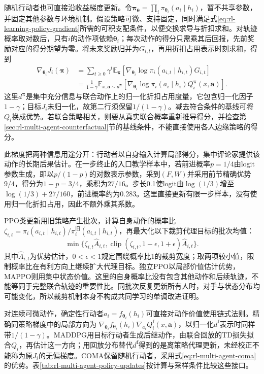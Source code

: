 随机行动者也可直接沿收益梯度更新。令$\bm\pi_{\bm\theta}=\prod_i\pi_{\bm\theta_i}(a_i\mid h_i)$，暂不共享参数，并固定其他参数与环境机制。假设策略可微、支持固定，同时满足式\eqref{eq:rl-learning-policy-gradient}所需的可积支配条件，以便交换求导与折扣求和。对轨迹概率取对数后，只有$i$的动作项依赖$\bm\theta_i$；每次动作的得分只需乘其后回报，先前奖励对应的得分期望为零。将未来奖励归并为$G_{i,t}$，再用折扣占用表示时刻求和，得到
\begin{align}
 \nabla_{\bm\theta_i}J_i(\bm\pi)
 &=\sum_{t\geq0}\gamma^t
   \mathbb E_{\bm\pi}
   [\nabla_{\bm\theta_i}\log\pi_i(a_{i,t}\mid h_{i,t})G_{i,t}]
 \nonumber\\
 &=\frac{1}{1-\gamma}
   \mathbb E_{x,\bm a\sim d^{\bm\pi}}
   [\nabla_{\bm\theta_i}\log\pi_i(a_i\mid h_i)
           Q_i^{\bm\pi}(x,\bm a)].
 \label{eq:rl-multi-agent-policy-gradient}
\end{align}
这里$d^{\bm\pi}$是集中充分信息与联合动作上的归一化折扣占用度量，它包含归一化因子$1-\gamma$；目标$J_i$未归一化，故第二行须保留$1/(1-\gamma)$。减去符合条件的基线可将$Q_i$换成优势。若联合策略相关，则要从真实联合概率重新推导得分，并检查第\ref{sec:rl-multi-agent-counterfactual}节的基线条件，不能直接使用各人边缘策略的得分。

此梯度把两种信息用途分开：行动者以自身输入计算局部得分，集中评论家提供该动作的长期后果估计。在一步终止的入口教学样本中，若前进概率$p=1/4$由logit参数生成，即以$p/(1-p)$的对数表示参数，采到$(F,W)$并采用前节精确优势$9/4$，得分为$1-p=3/4$，乘积为$27/16$。步长0.1使logit由$\log(1/3)$增至$\log(1/3)+27/160$，前进概率约为0.283。这里直接更新有限一步样本，没有使用归一化折扣占用，因此不额外乘其系数。

PPO类更新用旧策略产生批次，计算自身动作的概率比$\zeta_{i,t}=\pi_i(a_{i,t}\mid h_{i,t})/
\pi_i^{\text{旧}}(a_{i,t}\mid h_{i,t})$，再最大化以下裁剪代理目标的批次均值：
\[
 \min\{\zeta_{i,t}\widehat A_{i,t},
       \operatorname{clip}(\zeta_{i,t},1-\epsilon,1+\epsilon)
                      \widehat A_{i,t}\}.
\]
其中$\widehat A_{i,t}$为优势估计，$0<\epsilon<1$规定围绕概率比1的裁剪宽度；取两项较小值，限制概率比在有利方向上继续扩大代理目标。独立PPO以局部价值估计优势，MAPPO则用集中状态价值。这里的自身概率比没有包含其他动作和后续轨迹，不能等同于完整联合轨迹的重要性比。同批次反复更新所有人时，对手与状态分布均可能变化，所以裁剪机制本身不构成共同学习的单调改进证明。

对连续可微动作，确定性行动者$a_i=f_{\bm\theta_i}(h_i)$可直接对动作价值使用链式法则。精确同策略梯度中的局部方向为
$\nabla_{\bm\theta_i}f_{\bm\theta_i}(h_i)\nabla_{a_i}Q_i^{\bm f}(x,\bm a)$，以归一化$d^{\bm f}$表示时同样带$1/(1-\gamma)$。MADDPG用目标行动者生成后继动作，由联合回放的TD损失拟合$Q_i$，再估计这一方向；用回放分布替代$d^{\bm f}$得到的是离策略代理更新，未经校正不能称为原$J_i$的无偏梯度。COMA保留随机行动者，采用式\eqref{eq:rl-multi-agent-coma}的优势。表\ref{tab:rl-multi-agent-policy-updates}按计算与采样条件比较这些接口。

